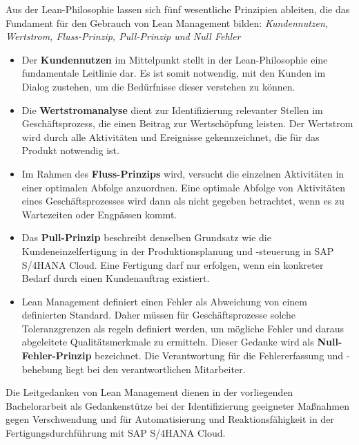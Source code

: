 \newpage

Aus der Lean-Philosophie lassen sich fünf wesentliche Prinzipien ableiten, die das Fundament für den Gebrauch von Lean Management bilden: \textit{Kundennutzen, Wertstrom, Fluss-Prinzip, Pull-Prinzip und Null Fehler}\begin{itemize}
    \item 
    Der \textbf{Kundennutzen} im Mittelpunkt stellt in der Lean-Philosophie eine fundamentale Leitlinie dar. 
    Es ist somit notwendig, mit den Kunden im Dialog zustehen, um die Bedürfnisse dieser verstehen zu können.
    \cite{Muller.2011} 
    \item
    Die \textbf{Wertstromanalyse} dient zur Identifizierung relevanter Stellen im Geschäftsprozess, die einen Beitrag zur Wertschöpfung leisten. Der Wertstrom wird durch alle Aktivitäten und Ereignisse gekennzeichnet, die für das Produkt notwendig ist. 
    \item
    Im Rahmen des \textbf{Fluss-Prinzips} wird, versucht die einzelnen Aktivitäten in einer optimalen Abfolge anzuordnen. Eine optimale Abfolge von Aktivitäten eines Geschäftsprozesses wird dann als nicht gegeben betrachtet, wenn es zu Wartezeiten oder Engpässen kommt.
    \item
    Das \textbf{Pull-Prinzip} beschreibt denselben Grundsatz wie die Kundeneinzelfertigung in der Produktionsplanung und -steuerung in SAP S/4HANA Cloud. Eine Fertigung darf nur erfolgen, wenn ein konkreter Bedarf durch einen Kundenauftrag existiert.
    \item
    Lean Management definiert einen Fehler als Abweichung von einem definierten Standard. Daher müssen für Geschäftsprozesse solche Toleranzgrenzen als regeln definiert werden, um mögliche Fehler und daraus abgeleitete Qualitätsmerkmale zu ermitteln. Dieser Gedanke wird als \textbf{Null-Fehler-Prinzip} bezeichnet.
    Die Verantwortung für die Fehlererfassung und -behebung liegt bei den verantwortlichen Mitarbeiter.
\end{itemize}

Die Leitgedanken von Lean Management dienen in der vorliegenden Bachelorarbeit als Gedankenstütze bei der Identifizierung geeigneter Maßnahmen gegen Verschwendung und für Automatisierung und Reaktionsfähigkeit in der Fertigungsdurchführung mit SAP S/4HANA Cloud.